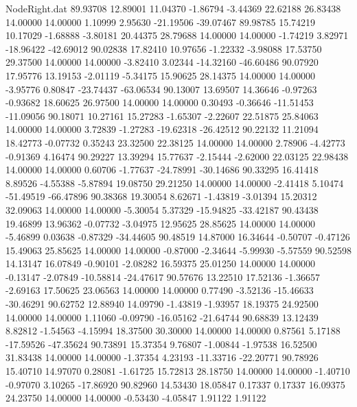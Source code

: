 \begin{filecontents}{NodeRight.dat}
  89.93708   12.89001   11.04370    -1.86794   -3.44369   22.62188   26.83438   14.00000   14.00000    1.10999    2.95630  -21.19506  -39.07467
  89.98785   15.74219   10.17029    -1.68888   -3.80181   20.44375   28.79688   14.00000   14.00000   -1.74219    3.82971  -18.96422  -42.69012
  90.02838   17.82410   10.97656    -1.22332   -3.98088   17.53750   29.37500   14.00000   14.00000   -3.82410    3.02344  -14.32160  -46.60486
  90.07920   17.95776   13.19153    -2.01119   -5.34175   15.90625   28.14375   14.00000   14.00000   -3.95776    0.80847  -23.74437  -63.06534
  90.13007   13.69507   14.36646    -0.97263   -0.93682   18.60625   26.97500   14.00000   14.00000    0.30493   -0.36646  -11.51453  -11.09056
  90.18071   10.27161   15.27283    -1.65307   -2.22607   22.51875   25.84063   14.00000   14.00000    3.72839   -1.27283  -19.62318  -26.42512
  90.22132   11.21094   18.42773    -0.07732    0.35243   23.32500   22.38125   14.00000   14.00000    2.78906   -4.42773   -0.91369    4.16474
  90.29227   13.39294   15.77637    -2.15444   -2.62000   22.03125   22.98438   14.00000   14.00000    0.60706   -1.77637  -24.78991  -30.14686
  90.33295   16.41418    8.89526    -4.55388   -5.87894   19.08750   29.21250   14.00000   14.00000   -2.41418    5.10474  -51.49519  -66.47896
  90.38368   19.30054    8.62671    -1.43819   -3.01394   15.20312   32.09063   14.00000   14.00000   -5.30054    5.37329  -15.94825  -33.42187
  90.43438   19.46899   13.96362    -0.07732   -3.04975   12.95625   28.85625   14.00000   14.00000   -5.46899    0.03638   -0.87329  -34.44605
  90.48519   14.87000   16.34644    -0.50707   -0.47126   15.49063   25.85625   14.00000   14.00000   -0.87000   -2.34644   -5.99930   -5.57559
  90.52598   14.13147   16.07849    -0.90101   -2.08282   16.59375   25.01250   14.00000   14.00000   -0.13147   -2.07849  -10.58814  -24.47617
  90.57676   13.22510   17.52136    -1.36657   -2.69163   17.50625   23.06563   14.00000   14.00000    0.77490   -3.52136  -15.46633  -30.46291
  90.62752   12.88940   14.09790    -1.43819   -1.93957   18.19375   24.92500   14.00000   14.00000    1.11060   -0.09790  -16.05162  -21.64744
  90.68839   13.12439    8.82812    -1.54563   -4.15994   18.37500   30.30000   14.00000   14.00000    0.87561    5.17188  -17.59526  -47.35624
  90.73891   15.37354    9.76807    -1.00844   -1.97538   16.52500   31.83438   14.00000   14.00000   -1.37354    4.23193  -11.33716  -22.20771
  90.78926   15.40710   14.97070     0.28081   -1.61725   15.72813   28.18750   14.00000   14.00000   -1.40710   -0.97070    3.10265  -17.86920
  90.82960   14.53430   18.05847     0.17337    0.17337   16.09375   24.23750   14.00000   14.00000   -0.53430   -4.05847    1.91122    1.91122

\end{filecontents}

